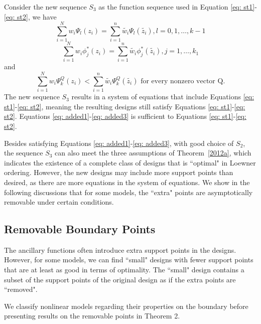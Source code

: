 \documentclass[12pt]{TD-CJS}
\begin{document}
Consider the new sequence $S_3$ as the function sequence used in Equation \eqref{eq: st1}-\eqref{eq: st2}, we have \begin{equation}\label{eq: added1}
\sum_{i=1}^Nw_i\Psi_l(z_i)=\sum_{i=1}^n\tilde{w_i}\Psi_l(\tilde{z_i}), l=0,1,\ldots, k-1    
\end{equation}
\begin{equation}\label{eq: added2}
\sum_{i=1}^Nw_i\phi_j^*(z_i)=\sum_{i=1}^n\tilde{w_i}\phi_j^*(\tilde{z_i}), j=1,\ldots, k_1    
\end{equation}and \begin{equation}\label{eq: added3}
\sum_{i=1}^Nw_i\Psi_k^Q(z_i)<\sum_{i=1}^n\tilde{w_i}\Psi_k^Q(\tilde{z_i}) \text{  for every nonzero vector Q}.
\end{equation}
The new sequence $S_3$ results in a system of equations that include Equations \eqref{eq: st1}-\eqref{eq: st2}, meaning the resulting designs still satisfy Equations \eqref{eq: st1}-\eqref{eq: st2}. Equations \eqref{eq: added1}-\eqref{eq: added3} is sufficient to Equations \eqref{eq: st1}-\eqref{eq: st2}.


Besides satisfying Equations \eqref{eq: added1}-\eqref{eq: added3}, with good choice of $S_2$, the sequence $S_3$ can also meet the three assumptions of Theorem~\ref{2012a}, which indicates the existence of a complete class of designs that is ``optimal" in Loewner ordering. However, the new designs may include more support points than desired, as there are more equations in the system of equations. We show in the following discussions that for some models, the ``extra" points are asymptotically removable under certain conditions.

 
\subsection{Removable Boundary Points}
The ancillary functions often introduce extra support points in the designs. However, for some models, we can find ``small" designs with fewer support points that are at least as good in terms of optimality. The ``small" design contains a subset of the support points of the original design as if the extra points are ``removed". 

We classify nonlinear models regarding their properties on the boundary before presenting results on the removable points in Theorem 2.
\end{document}
